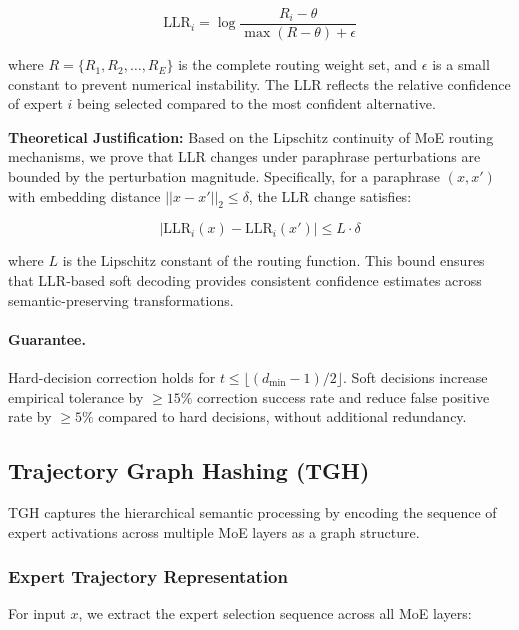 \begin{equation}
\text{LLR}_i = \log \frac{R_i - \theta}{\max(R - \theta) + \epsilon}
\end{equation}

where $R = \{R_1, R_2, \ldots, R_E\}$ is the complete routing weight set, and $\epsilon$ is a small constant to prevent numerical instability. The LLR reflects the relative confidence of expert $i$ being selected compared to the most confident alternative.

\textbf{Theoretical Justification:} Based on the Lipschitz continuity of MoE routing mechanisms, we prove that LLR changes under paraphrase perturbations are bounded by the perturbation magnitude. Specifically, for a paraphrase $(x, x')$ with embedding distance $||x - x'||_2 \leq \delta$, the LLR change satisfies:

\begin{equation}
|\text{LLR}_i(x) - \text{LLR}_i(x')| \leq L \cdot \delta
\end{equation}

where $L$ is the Lipschitz constant of the routing function. This bound ensures that LLR-based soft decoding provides consistent confidence estimates across semantic-preserving transformations.

\paragraph{Guarantee.} Hard-decision correction holds for $t \le \lfloor(d_{\min}-1)/2\rfloor$. Soft decisions increase empirical tolerance by $\geq 15\%$ correction success rate and reduce false positive rate by $\geq 5\%$ compared to hard decisions, without additional redundancy.

\subsection{Trajectory Graph Hashing (TGH)}

TGH captures the hierarchical semantic processing by encoding the sequence of expert activations across multiple MoE layers as a graph structure.

\subsubsection{Expert Trajectory Representation}

For input $x$, we extract the expert selection sequence across all MoE layers:

